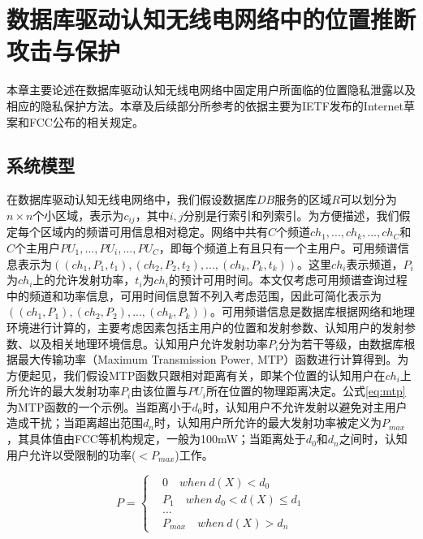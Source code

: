 
\chapter{数据库驱动认知无线电网络中的位置推断攻击与保护}
\label{chap:fixed}

本章主要论述在数据库驱动认知无线电网络中固定用户所面临的位置隐私泄露以及相应的隐私保护方法。本章及后续部分所参考的依据主要为IETF发布的Internet草案和FCC公布的相关规定。

\section{系统模型}\label{sec:model}

在数据库驱动认知无线电网络中，我们假设数据库$DB$服务的区域$R$可以划分为$n \times n$个小区域，表示为$c_{ij}$，其中$i,j$分别是行索引和列索引。为方便描述，我们假定每个区域内的频谱可用信息相对稳定。网络中共有$C$个频道$ch_{1},...,ch_{k},...,ch_{C}$和$C$个主用户$PU_{1},...,PU_{i},...,PU_{C}$，即每个频道上有且只有一个主用户。可用频谱信息表示为$((ch_{1},P_{1},t_{1}),(ch_{2},P_{2},t_{2}),...,(ch_{k},P_{k},t_{k}))$。这里$ch_{i}$表示频道，$P_{i}$为$ch_{i}$上的允许发射功率，$t_{i}$为$ch_{i}$的预计可用时间。本文仅考虑可用频谱查询过程中的频道和功率信息，可用时间信息暂不列入考虑范围，因此可简化表示为$((ch_{1},P_{1}),(ch_{2},P_{2}),...,(ch_{k},P_{k}))$。可用频谱信息是数据库根据网络和地理环境进行计算的，主要考虑因素包括主用户的位置和发射参数、认知用户的发射参数、以及相关地理环境信息。认知用户允许发射功率$P_{i}$分为若干等级，由数据库根据最大传输功率（Maximum Transmission Power, MTP）函数进行计算得到。为方便起见，我们假设MTP函数只跟相对距离有关，即某个位置的认知用户在$ch_{i}$上所允许的最大发射功率$P_{i}$由该位置与$PU_{i}$所在位置的物理距离决定。公式\ref{eq:mtp}为MTP函数的一个示例。当距离小于$d_{0}$时，认知用户不允许发射以避免对主用户造成干扰；当距离超出范围$d_{n}$时，认知用户所允许的最大发射功率被定义为$P_{max}$，其具体值由FCC等机构规定，一般为100mW；当距离处于$d_{0}$和$d_{n}$之间时，认知用户允许以受限制的功率($<P_{max}$)工作。

\begin{equation}\label{eq:mtp}
P=\left\{
\begin{aligned}
&0  \quad when \ d(X)<d_{0} \\
&P_{1} \quad when \ d_{0} < d(X) \leq d_{1} \\
&... \\
&P_{max} \quad when \ d(X) > d_{n}
\end{aligned}
\right.
\end{equation}

